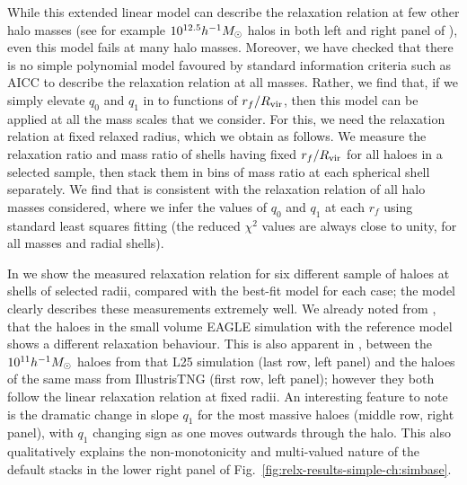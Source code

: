 While this extended linear model can describe the relaxation relation at few other halo masses (see for example $10^{12.5}h^{-1}M_{\odot}$ halos in both left and right panel of ), even this model fails at many halo masses.
Moreover, we have checked that there is no simple polynomial model favoured by standard information criteria such as AICC \citep[][]{2007MNRAS.377L..74L}
to describe the relaxation relation at all masses.
Rather,  we find that, if we 
simply elevate $q_0$ and $q_1$ in  to functions of $r_f/R_{\rm vir}$, then this model
can be applied at all the mass scales that we consider. For this, we need the relaxation relation at fixed relaxed radius, which we obtain as follows. We measure the relaxation ratio and mass ratio of shells having fixed $r_f/R_{\rm vir}$ for all haloes in a selected sample, then stack them in bins
of mass ratio at each spherical shell separately. 
We find that 
is consistent with the relaxation relation of all halo masses considered, where we infer the values of $q_0$ and $q_1$ at each $r_f$ using standard least squares fitting (the reduced $\chi^2$ values are always close to unity, for all masses and radial shells).

In  we show the measured relaxation relation for six different sample of haloes at shells of selected radii, compared with the best-fit model  for each case; the model clearly describes these measurements extremely well. We already noted from , that the haloes in the small volume EAGLE simulation with the reference model shows a different relaxation behaviour. This is also apparent in , between the $10^{11} h^{-1}M_{\odot}$ haloes from that L25 simulation (last row, left panel) and the haloes of the same mass from IllustrisTNG (first row, left panel); however they both follow the linear relaxation relation at fixed radii. An interesting feature to note is the dramatic change in slope $q_1$ for the most massive haloes (middle row, right panel), with $q_1$ changing sign as one moves outwards through the halo. This also qualitatively explains the non-monotonicity and multi-valued nature of the default stacks in the lower right panel of Fig.~\ref{fig:relx-results-simple-ch:simbase}.


